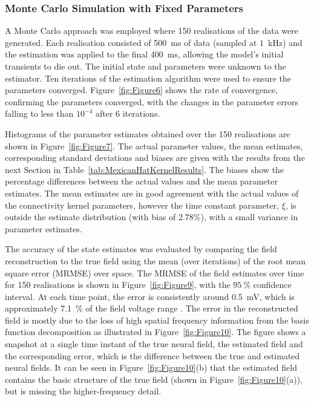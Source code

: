 \documentclass[12pt]{iopart}
\begin{document}
\subsubsection{Monte Carlo Simulation with Fixed Parameters}
A Monte Carlo approach was employed where 150 realisations of the data were generated. Each realisation consisted of 500~ms of data (sampled at $1$~kHz) and the estimation was applied to the final 400~ms, allowing the model's initial transients to die out. The initial state and parameters were unknown to the estimator. Ten iterations of the estimation algorithm were used to ensure the parameters converged. Figure~\ref{fig:Figure6} shows the rate of convergence, confirming the parameters converged, with the changes in the parameter errors falling to less than $10^{-4}$ after 6 iterations.

Histograms of the parameter estimates obtained over the 150 realisations are shown in Figure~\ref{fig:Figure7}. The actual parameter values, the mean estimates, corresponding standard deviations and biases are given with the results from the next Section in Table~\ref{tab:MexicanHatKernelResults}. The biases show the percentage differences between the actual values and the mean parameter estimates. The mean estimates are in good agreement with the actual values of the connectivity kernel parameters, however the time constant parameter, $\xi$, is outside the estimate distribution (with bias of 2.78\%), with a small variance in parameter estimates.

The accuracy of the state estimates was evaluated by comparing the field reconstruction to the true field using the mean (over iterations) of the root mean square error (MRMSE) over space. The MRMSE of the field estimates over time for 150 realisations is shown in Figure~\ref{fig:Figure9}, with the $95~\%$ confidence interval. At each time point, the error is consistently around 0.5~mV, which is approximately 7.1~\% of the field voltage range . The error in the reconstructed field is mostly due to the loss of high spatial frequency information from the basis function decomposition as illustrated in Figure~\ref{fig:Figure10}. The figure shows a snapshot at a single time instant of the true neural field, the estimated field and the corresponding error, which is the difference between the true and estimated neural fields. It can be seen in Figure~\ref{fig:Figure10}(b) that the estimated field contains the basic structure of the true field (shown in Figure~\ref{fig:Figure10}(a)), but is missing the higher-frequency detail.
\end{document}
